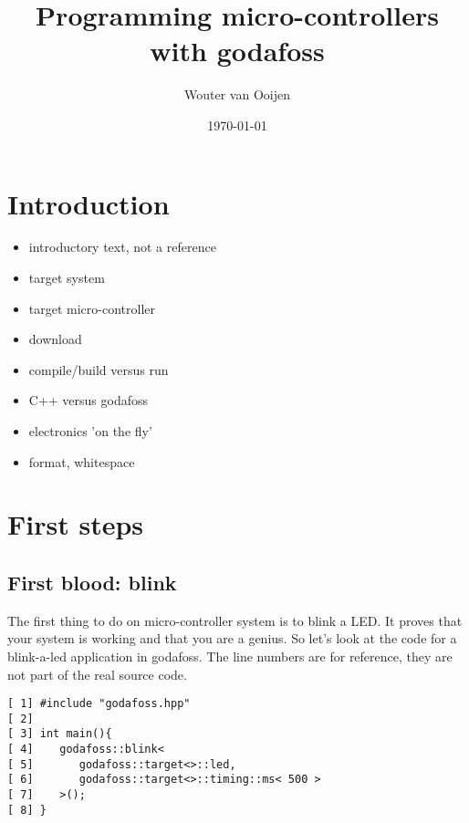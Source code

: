 \documentclass{article}
\author{Wouter van Ooijen}
\title{Programming micro-controllers with godafoss}
\date{\today}
\begin{document}
\maketitle

\section{Introduction}

\begin{itemize}
\item  introductory text, not a reference
\item  target system
\item  target micro-controller
\item  download
\item  compile/build versus run
\item  C++ versus godafoss
\item  electronics 'on the fly'
\item  format, whitespace
\end{itemize}

%
\section{First steps}
%

\subsection{First blood: blink}

The first thing to do on micro-controller system is to blink a LED.
It proves that your system is working and that you are a genius.
So let's look at the code for a blink-a-led application in godafoss.
The line numbers are for reference, they are not part of the real
source code.

\lstset {language=C++}
\begin{lstlisting}
[ 1] #include "godafoss.hpp"
[ 2]
[ 3] int main(){
[ 4]    godafoss::blink<
[ 5]       godafoss::target<>::led,
[ 6]       godafoss::target<>::timing::ms< 500 >
[ 7]    >();
[ 8] }
\end{lstlisting}
\end{document}
